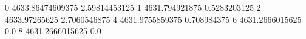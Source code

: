 0 4633.86474609375 2.59814453125
1 4631.794921875 0.5283203125
2 4633.97265625 2.7060546875
4 4631.9755859375 0.708984375
6 4631.2666015625 0.0
8 4631.2666015625 0.0
